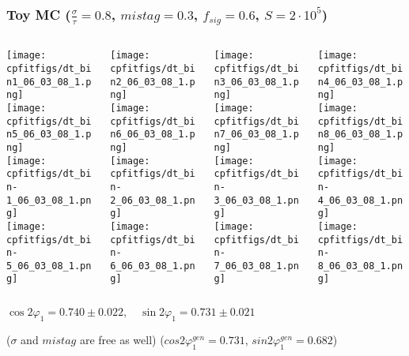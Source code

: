 \documentclass[10 pt,compress,mathserif]{beamer}
\begin{document}
\begin{frame}
 \frametitle{Toy MC ($\frac{\sigma}{\tau}=0.8$, $mistag = 0.3$, $f_{sig} = 0.6$, $S = 2\cdot10^5$)}
 \begin{columns}
  \begin{column}{0.25\textwidth}
   \texttt{[image: cpfitfigs/dt\_bin1\_06\_03\_08\_1.png]}\\
   \texttt{[image: cpfitfigs/dt\_bin5\_06\_03\_08\_1.png]}\\
   \texttt{[image: cpfitfigs/dt\_bin-1\_06\_03\_08\_1.png]}\\
   \texttt{[image: cpfitfigs/dt\_bin-5\_06\_03\_08\_1.png]}
  \end{column}
  \begin{column}{0.25\textwidth}
   \texttt{[image: cpfitfigs/dt\_bin2\_06\_03\_08\_1.png]}\\
   \texttt{[image: cpfitfigs/dt\_bin6\_06\_03\_08\_1.png]}\\
   \texttt{[image: cpfitfigs/dt\_bin-2\_06\_03\_08\_1.png]}\\
   \texttt{[image: cpfitfigs/dt\_bin-6\_06\_03\_08\_1.png]}
  \end{column}
  \begin{column}{0.25\textwidth}
   \texttt{[image: cpfitfigs/dt\_bin3\_06\_03\_08\_1.png]}\\
   \texttt{[image: cpfitfigs/dt\_bin7\_06\_03\_08\_1.png]}\\
   \texttt{[image: cpfitfigs/dt\_bin-3\_06\_03\_08\_1.png]}\\
   \texttt{[image: cpfitfigs/dt\_bin-7\_06\_03\_08\_1.png]}
  \end{column}
  \begin{column}{0.25\textwidth}
   \texttt{[image: cpfitfigs/dt\_bin4\_06\_03\_08\_1.png]}\\
   \texttt{[image: cpfitfigs/dt\_bin8\_06\_03\_08\_1.png]}\\
   \texttt{[image: cpfitfigs/dt\_bin-4\_06\_03\_08\_1.png]}\\
   \texttt{[image: cpfitfigs/dt\_bin-8\_06\_03\_08\_1.png]}
  \end{column}
 \end{columns}
 \begin{center}
  $\cos{2\varphi_1} = 0.740 \pm 0.022,\quad \sin{2\varphi_1} = 0.731 \pm 0.021$

  ($\sigma$ and $mistag$ are free as well)  ($cos2\varphi^{gen}_1 = 0.731$, $sin2\varphi^{gen}_1 = 0.682$)
 \end{center}
\end{frame}
\end{document}
